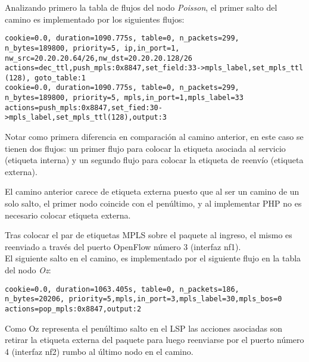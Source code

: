 Analizando primero la tabla de flujos del nodo \textit{Poisson}, el primer salto del camino es implementado por los siguientes flujos:

\begin{center}
\texttt{cookie=0.0, duration=1090.775s, table=0, n\_packets=299, \\
n\_bytes=189800, priority=5, ip,in\_port=1,\\ 
nw\_src=20.20.20.64/26,nw\_dst=20.20.20.128/26 \\
actions=dec\_ttl,push\_mpls:0x8847,set\_field:33->mpls\_label,set\_mpls\_ttl (128), goto\_table:1 \\
\vspace{0.5cm}
cookie=0.0, duration=1090.775s, table=0, n\_packets=299, \\
n\_bytes=189800, priority=5, mpls,in\_port=1,mpls\_label=33 \\
actions=push\_mpls:0x8847,set\_fied:30->mpls\_label,set\_mpls\_ttl(128),output:3
}
\end{center}

Notar como primera diferencia en comparación al camino anterior, en este caso se tienen dos flujos: un primer flujo para colocar la etiqueta asociada al servicio (etiqueta interna) y un segundo flujo para colocar la etiqueta de reenvío (etiqueta externa). 

El camino anterior carece de etiqueta externa puesto que al ser un camino de un solo salto, el primer nodo coincide con el pen\'ultimo, y al implementar PHP no es necesario colocar etiqueta externa. 

Tras colocar el par de etiquetas MPLS sobre el paquete al ingreso, el mismo es reenviado a trav\'es del puerto OpenFlow n\'umero 3 (interfaz nf1).\\

El siguiente salto en el camino, es implementado por el siguiente flujo en la tabla del nodo \textit{Oz}:

\newpage
\begin{center}
\texttt{cookie=0.0, duration=1063.405s, table=0, n\_packets=186, \\
n\_bytes=20206, priority=5,mpls,in\_port=3,mpls\_label=30,mpls\_bos=0 \\
actions=pop\_mpls:0x8847,output:2 }
\end{center}

Como Oz representa el penúltimo salto en el LSP las acciones asociadas son retirar la etiqueta externa del paquete para luego reenviarse por el puerto n\'umero 4 (interfaz nf2) rumbo al \'ultimo nodo en el camino.\\

